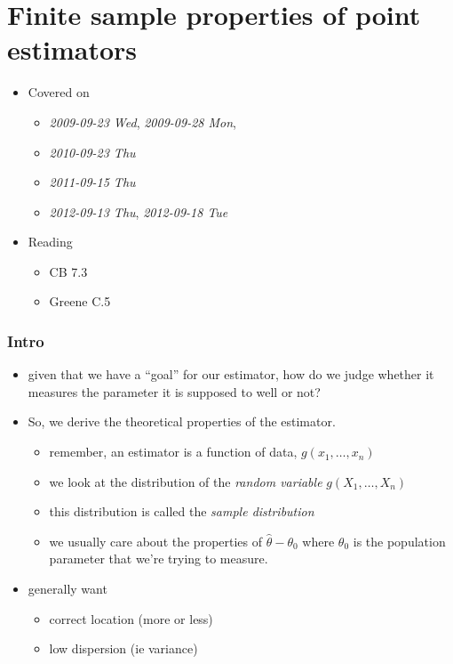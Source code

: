 
\part{Finite sample properties of point estimators}

\begin{itemize}
\item Covered on
\begin{itemize}
\item \textit{2009-09-23 Wed}, \textit{2009-09-28 Mon},
\item \textit{2010-09-23 Thu}
\item \textit{2011-09-15 Thu}
\item \textit{2012-09-13 Thu}, \textit{2012-09-18 Tue}
\end{itemize}
\item Reading
\begin{itemize}
\item CB 7.3
\item Greene C.5
\end{itemize}
\end{itemize}
\section{Intro}
\label{sec-1}

\begin{itemize}
\item given that we have a ``goal'' for our estimator, how do we judge
     whether it measures the parameter it is supposed to well or not?
\item So, we derive the theoretical properties of the estimator.
\begin{itemize}
\item remember, an estimator is a function of data, $g(x_1,\dots,x_n)$
\item we look at the distribution of the \emph{random variable} $g(X_1,\dots,X_n)$
\item this distribution is called the \emph{sample distribution}
\item we usually care about the properties of $\hat \theta -
       \theta_0$ where $\theta_0$ is the population parameter that
       we're trying to measure.
\end{itemize}
\item generally want
\begin{itemize}
\item correct location (more or less)
\item low dispersion (ie variance)
\end{itemize}
\end{itemize}
